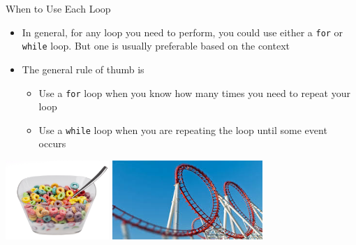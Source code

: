 {}\documentclass[letterpaper,
compress,
xcolor=x11names,
]{beamer}
\begin{document}

\begin{frame}{When to Use Each Loop}
	\footnotesize
	\begin{itemize}
		\item In general, for any loop you need to perform, you could use either a \texttt{for} or \texttt{while} loop. But one is usually preferable based on the context
		\item The general rule of thumb is
		\begin{itemize}
			\item Use a \texttt{for} loop when you know how many times you need to repeat your loop 
			\item Use a \texttt{while} loop when you are repeating the loop until some event occurs
		\end{itemize}
	\end{itemize}
	\begin{center}
		\includegraphics[height = 3cm]{Cereal_loops.jpg}
		\includegraphics[height = 3cm]{Coaster_loops.jpg}
	\end{center}
\end{frame}

\end{document}

